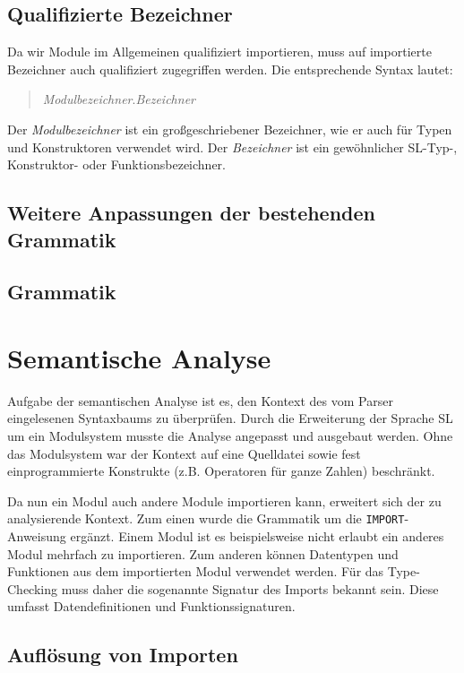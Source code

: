 \documentclass[runningheads]{llncs}
\begin{document}
\subsection{Qualifizierte Bezeichner}
Da wir Module im Allgemeinen qualifiziert importieren, muss auf
importierte Bezeichner auch qualifiziert zugegriffen werden. Die
entsprechende Syntax lautet:

\begin{quote}
\emph{Modulbezeichner}.\emph{Bezeichner}
\end{quote}

Der \emph{Modulbezeichner} ist ein großgeschriebener Bezeichner, wie
er auch für Typen und Konstruktoren verwendet wird.  Der
\emph{Bezeichner} ist ein gewöhnlicher SL-Typ-, Konstruktor- oder
Funktionsbezeichner. 

\subsection{Weitere Anpassungen der bestehenden Grammatik}
\label{sec:syntaxAdjustments}

\subsection{Grammatik}

\section{Semantische Analyse}\label{sec:semantics}

Aufgabe der semantischen Analyse ist es, den Kontext des vom Parser eingelesenen Syntaxbaums zu überprüfen. Durch die Erweiterung der Sprache SL um ein Modulsystem musste die Analyse angepasst und ausgebaut werden. Ohne das Modulsystem war der Kontext auf eine Quelldatei sowie fest einprogrammierte Konstrukte (z.B. Operatoren für ganze Zahlen) beschränkt.

Da nun ein Modul auch andere Module importieren kann, erweitert sich der zu analysierende Kontext. Zum einen wurde die Grammatik um die \verb|IMPORT|-Anweisung ergänzt. Einem Modul ist es beispielsweise nicht erlaubt ein anderes Modul mehrfach zu importieren. Zum anderen können Datentypen und Funktionen aus dem importierten Modul verwendet werden. Für das Type-Checking muss daher die sogenannte Signatur des Imports bekannt sein. Diese umfasst Datendefinitionen und Funktionssignaturen.

\subsection{Auflösung von Importen}
\end{document}
